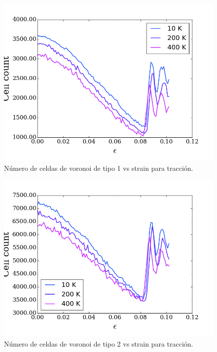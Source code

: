 \documentclass[10pt, oneside]{article} %
\begin{document}
\begin{figure}[H]
\centering
\includegraphics[width=15cm]{Figures/NanoParticles/voro_type1_tension.png}
\caption{Número de celdas de voronoi de tipo 1 vs strain para tracción.}
\end{figure}

\begin{figure}[H]
\centering
\includegraphics[width=15cm]{Figures/NanoParticles/voro_type2_tension.png}
\caption{Número de celdas de voronoi de tipo 2 vs strain para tracción.}
\end{figure}
\end{document}
